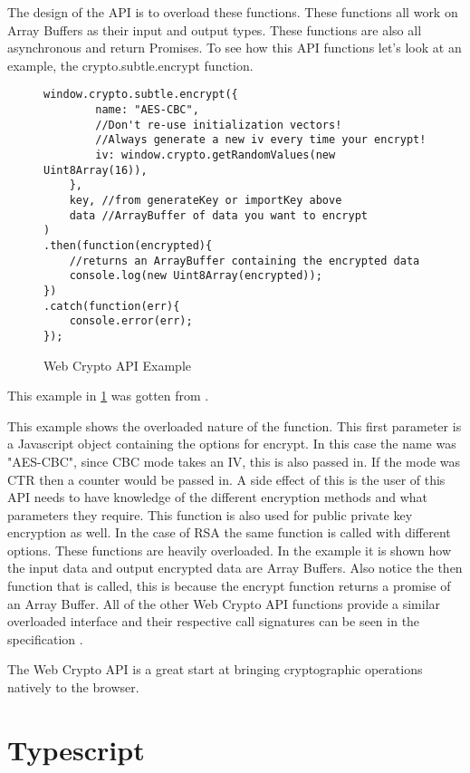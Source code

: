 The design of the API is to overload these functions. These functions all work on Array Buffers as their input and output types. These functions are also all asynchronous and return Promises. To see how this API functions let's look at an example, the crypto.subtle.encrypt function.


\begin{figure}[!htbp]
\centering
\begin{lstlisting}[basicstyle=\small]
window.crypto.subtle.encrypt({
        name: "AES-CBC",
        //Don't re-use initialization vectors!
        //Always generate a new iv every time your encrypt!
        iv: window.crypto.getRandomValues(new Uint8Array(16)),
    },
    key, //from generateKey or importKey above
    data //ArrayBuffer of data you want to encrypt
)
.then(function(encrypted){
    //returns an ArrayBuffer containing the encrypted data
    console.log(new Uint8Array(encrypted));
})
.catch(function(err){
    console.error(err);
});
\end{lstlisting}
\caption{Web Crypto API Example}
\label{fig:wcexample}
\end{figure}


This example in \ref{fig:wcexample} was gotten from \cite{aes-example}.


This example shows the overloaded nature of the function. This first parameter is a Javascript object containing the options for encrypt. In this case the name was "AES-CBC", since CBC mode takes an IV, this is also passed in. If the mode was CTR then a counter would be passed in. A side effect of this is the user of this API needs to have knowledge of the different encryption methods and what parameters they require. This function is also used for public private key encryption as well. In the case of RSA the same function is called with different options. These functions are heavily overloaded. In the example it is shown how the input data and output encrypted data are Array Buffers. Also notice the then function that is called, this is because the encrypt function returns a promise of an Array Buffer. All of the other Web Crypto API functions provide a similar overloaded interface and their respective call signatures can be seen in the specification \cite{webcrypto-overview}.


The Web Crypto API is a great start at bringing cryptographic operations natively to the browser.


\section{Typescript}



